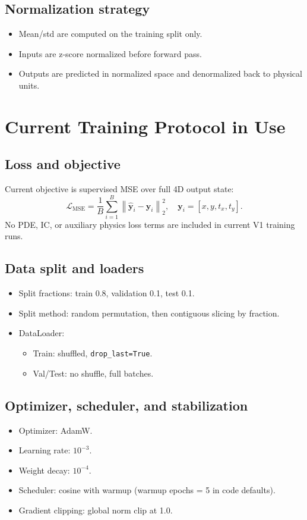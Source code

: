 \documentclass[11pt,a4paper]{article}
\begin{document}
\subsection{Normalization strategy}
\begin{itemize}[leftmargin=*]
  \item Mean/std are computed on the training split only.
  \item Inputs are z-score normalized before forward pass.
  \item Outputs are predicted in normalized space and denormalized back to physical units.
\end{itemize}

\section{Current Training Protocol in Use}
\subsection{Loss and objective}
Current objective is supervised MSE over full 4D output state:
\begin{equation}
\mathcal{L}_{\mathrm{MSE}} = \frac{1}{B}\sum_{i=1}^{B}\left\|\hat{\mathbf{y}}_i - \mathbf{y}_i\right\|_2^2,
\quad
\mathbf{y}_i=[x,y,t_x,t_y].
\end{equation}
No PDE, IC, or auxiliary physics loss terms are included in current V1 training runs.

\subsection{Data split and loaders}
\begin{itemize}[leftmargin=*]
  \item Split fractions: train 0.8, validation 0.1, test 0.1.
  \item Split method: random permutation, then contiguous slicing by fraction.
  \item DataLoader:
  \begin{itemize}[leftmargin=*]
    \item Train: shuffled, \texttt{drop\_last=True}.
    \item Val/Test: no shuffle, full batches.
  \end{itemize}
\end{itemize}

\subsection{Optimizer, scheduler, and stabilization}
\begin{itemize}[leftmargin=*]
  \item Optimizer: AdamW.
  \item Learning rate: $10^{-3}$.
  \item Weight decay: $10^{-4}$.
  \item Scheduler: cosine with warmup (warmup epochs = 5 in code defaults).
  \item Gradient clipping: global norm clip at 1.0.
\end{itemize}
\end{document}
